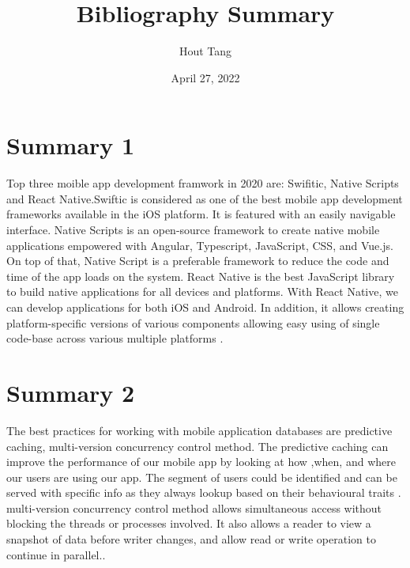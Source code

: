 \documentclass{article}
\title{Bibliography Summary}
\author{Hout Tang}
\date{April 27, 2022}
\begin{document}
\maketitle

\section*{Summary 1}
Top three moible app development framwork in 2020 are: Swifitic, Native Scripts and React Native.Swiftic is considered as one of the best mobile app development frameworks available in the iOS platform. It is featured with an easily navigable interface. Native Scripts is an open-source framework to create native mobile applications empowered with Angular, Typescript, JavaScript, CSS, and Vue.js. On top of that, Native Script is a preferable framework to reduce the code and time of the app loads on the system. React Native is the best JavaScript library to build native applications for all devices and platforms. With React Native, we can develop applications for both iOS and Android. In addition, it allows creating platform-specific versions of various components allowing easy using of single code-base across various multiple platforms \cite{RBArticle}.

 

\medskip

\section*{Summary 2}

The best practices for working with mobile application databases are predictive caching, multi-version concurrency control method. The predictive caching can improve the performance of our mobile app by looking at how ,when, and where our users are using our app. The segment of users could be identified and can be served with specific info as they always lookup based on their behavioural traits \cite{JSArticle}. multi-version concurrency control method allows simultaneous access without blocking the threads or processes involved. It also allows a reader to view a snapshot of data before writer changes, and allow read or write operation to continue in parallel.\cite{VTArticle}.
 
\printbibliography
\end{document}
